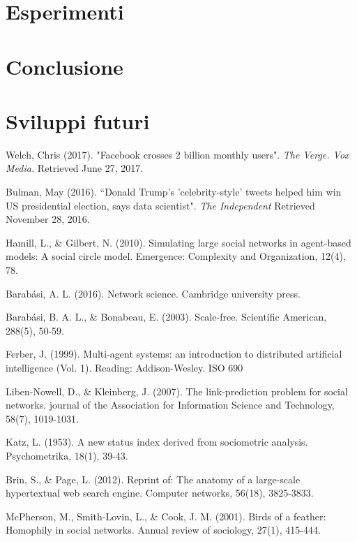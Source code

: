 \documentclass[a4paper,12pt]{article}
\begin{document}
\section{Esperimenti}
\label{sec:esp}
\section{Conclusione}
\label{sec:end}
\section{Sviluppi futuri}
\label{sec:future}


\begin{thebibliography}{9}
  Welch, Chris (2017). "Facebook crosses 2 billion monthly users". \textit{The Verge. Vox Media.} Retrieved June 27, 2017.
  
  Bulman, May (2016). ``Donald Trump's 'celebrity-style' tweets helped him win US presidential election, says data scientist".
\textit{The Independent} Retrieved November 28, 2016.

  Hamill, L., \& Gilbert, N. (2010). Simulating large social networks in agent-based models: A social circle model. Emergence: Complexity and Organization, 12(4), 78.

  Barabási, A. L. (2016). Network science. Cambridge university press.
  
  Barabási, B. A. L., \& Bonabeau, E. (2003). Scale-free. Scientific American, 288(5), 50-59.
  
  Ferber, J. (1999). Multi-agent systems: an introduction to distributed artificial intelligence (Vol. 1). Reading: Addison-Wesley.
ISO 690	

  Liben-Nowell, D., \& Kleinberg, J. (2007). The link-prediction problem for social networks. journal of the Association for Information Science and Technology, 58(7), 1019-1031.
  
  Katz, L. (1953). A new status index derived from sociometric analysis. Psychometrika, 18(1), 39-43.

  Brin, S., \& Page, L. (2012). Reprint of: The anatomy of a large-scale hypertextual web search engine. Computer networks, 56(18), 3825-3833.

  McPherson, M., Smith-Lovin, L., \& Cook, J. M. (2001). Birds of a feather: Homophily in social networks. Annual review of sociology, 27(1), 415-444.
  

\end{thebibliography}
\end{document}
